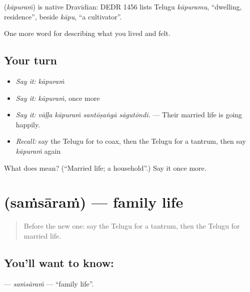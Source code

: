 \begin{cousinweb}
\textbf{} (\emph{kāpuraṁ}) is native Dravidian: DEDR 1456 lists Telugu \emph{kāpuramu}, \textquotedblleft{}dwelling, residence\textquotedblright{}, beside \emph{kāpu}, \textquotedblleft{}a cultivator\textquotedblright{}.
\end{cousinweb}

\begin{grammarlens}[title={What you've built}]
One more word for describing what you lived and felt.
\end{grammarlens}

\subsection*{Your turn}
\begin{itemize}
\raggedright
  \item \emph{Say it:} \emph{kāpuraṁ}
  \item \emph{Say it:} \emph{kāpuraṁ}, once more
  \item \emph{Say it:} \emph{vāḷḷa kāpuraṁ santōṣaṅgā sāgutōndi.} — Their married life is going happily.
  \item \emph{Recall:} say the Telugu for to coax, then the Telugu for a tantrum, then say \emph{kāpuraṁ} again
\end{itemize}

\begin{tcolorbox}[breakable,colback=teal!4,colframe=teal!35!black,title={Before you move on}]
What does  mean? (\textquotedblleft{}Married life; a household\textquotedblright{}.) Say it once more.
\end{tcolorbox}
\section[\texorpdfstring{\te{సంసారం} (saṁsāraṁ)}{సంసారం (saṁsāraṁ)}]{ (saṁsāraṁ) — family life}

\label{lesson:TE-C533-samsaram}



\begin{quote}
Before the new one: say the Telugu for a tantrum, then the Telugu for married life.
\end{quote}

\subsection*{You'll want to know: }
\textbf{} — \emph{saṁsāraṁ} — \textquotedblleft{}family life\textquotedblright{}.

